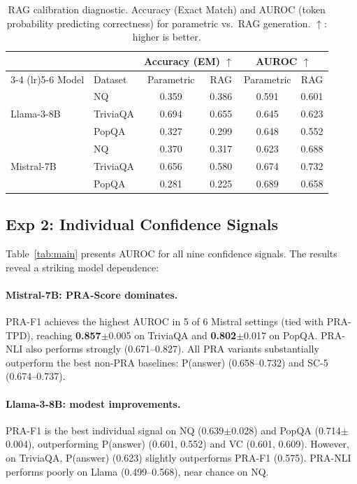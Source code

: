 \documentclass{article}
\begin{document}
\begin{table}[t]
\caption{RAG calibration diagnostic. Accuracy (Exact Match) and AUROC (token probability predicting correctness) for parametric vs.\ RAG generation. $\uparrow$: higher is better.}
\label{tab:calibration}
\centering
\small
\begin{tabular}{llcccc}
\toprule
& & \multicolumn{2}{c}{Accuracy (EM) $\uparrow$} & \multicolumn{2}{c}{AUROC $\uparrow$} \\
\cmidrule(lr){3-4} \cmidrule(lr){5-6}
Model & Dataset & Parametric & RAG & Parametric & RAG \\
\midrule
\multirow{3}{*}{Llama-3-8B} & NQ & 0.359 & 0.386 & 0.591 & 0.601 \\
& TriviaQA & 0.694 & 0.655 & 0.645 & 0.623 \\
& PopQA & 0.327 & 0.299 & 0.648 & 0.552 \\
\midrule
\multirow{3}{*}{Mistral-7B} & NQ & 0.370 & 0.317 & 0.623 & 0.688 \\
& TriviaQA & 0.656 & 0.580 & 0.674 & 0.732 \\
& PopQA & 0.281 & 0.225 & 0.689 & 0.658 \\
\bottomrule
\end{tabular}
\end{table}

\subsection{Exp 2: Individual Confidence Signals}

Table~\ref{tab:main} presents AUROC for all nine confidence signals. The results reveal a striking model dependence:

\paragraph{Mistral-7B: PRA-Score dominates.} PRA-F1 achieves the highest AUROC in 5 of 6 Mistral settings (tied with PRA-TPD), reaching \textbf{0.857}$\pm$0.005 on TriviaQA and \textbf{0.802}$\pm$0.017 on PopQA. PRA-NLI also performs strongly (0.671--0.827). All PRA variants substantially outperform the best non-PRA baselines: P(answer) (0.658--0.732) and SC-5 (0.674--0.737).

\paragraph{Llama-3-8B: modest improvements.} PRA-F1 is the best individual signal on NQ (0.639$\pm$0.028) and PopQA (0.714$\pm$0.004), outperforming P(answer) (0.601, 0.552) and VC (0.601, 0.609). However, on TriviaQA, P(answer) (0.623) slightly outperforms PRA-F1 (0.575). PRA-NLI performs poorly on Llama (0.499--0.568), near chance on NQ.
\end{document}
